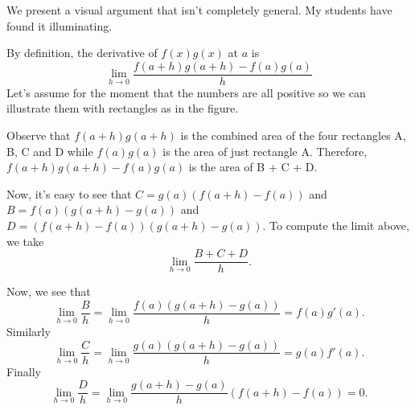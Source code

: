 \documentclass[11pt]{book}
\numberwithin{example}{chapter}
\begin{document}
\begin{center}
\end{center}


We present a visual argument that isn't completely general.  My students have found it illuminating. 

By definition, the derivative of $f(x)g(x)$ at $a$ is
$$\lim_{h\to 0}\frac{f(a+h)g(a+h)-f(a)g(a)}{h}$$
Let's assume for the moment that the numbers are all positive so we can illustrate them with rectangles as in the figure.

Observe that $f(a+h)g(a+h)$ is the combined area of the four rectangles A, B, C and D while $f(a)g(a)$ is the area of just rectangle A.  Therefore, $f(a+h)g(a+h)-f(a)g(a)$ is the area of B + C + D.  

Now, it's easy to see that $C=g(a)(f(a+h)-f(a))$ and $B=f(a)(g(a+h)-g(a))$ and $D=(f(a+h)-f(a))(g(a+h)-g(a))$.  To compute the limit above, we take 
$$\lim_{h\to 0} \frac{B+C+D}{h}.$$

Now, we see that 
$$\lim_{h\to 0} \frac{B}{h}=\lim_{h\to 0} \frac{f(a)(g(a+h)-g(a))}{h}=f(a)g'(a).$$
Similarly
$$\lim_{h\to 0} \frac{C}{h}=\lim_{h\to 0} \frac{g(a)(g(a+h)-g(a))}{h}=g(a)f'(a).$$
Finally
$$\lim_{h\to 0} \frac{D}{h}=\lim_{h\to 0} \frac{g(a+h)-g(a)}{h}(f(a+h)-f(a))=0.$$
\end{document}

